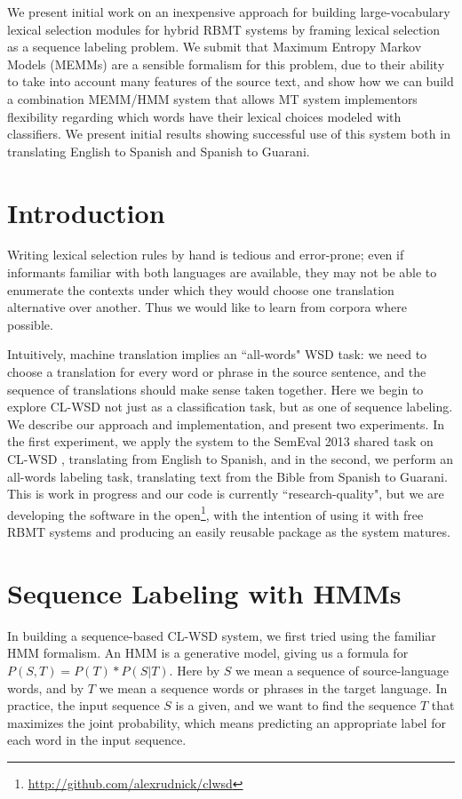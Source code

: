We present initial work on an inexpensive approach for building
large-vocabulary lexical selection modules for hybrid RBMT systems by framing
lexical selection as a sequence labeling problem. We submit that Maximum
Entropy Markov Models (MEMMs) are a sensible formalism for this problem, due to
their ability to take into account many features of the source text, and show
how we can build a combination MEMM/HMM system that allows MT system
implementors flexibility regarding which words have their lexical choices
modeled with classifiers. We present initial results showing successful use of
this system both in translating English to Spanish and Spanish to Guarani.

\lstset{
language=Python,
basicstyle=\small\sffamily,
numbers=none,
numberstyle=\tiny,
frame=tb,
columns=fullflexible,
showstringspaces=false
}


\section{Introduction}

Writing lexical selection rules by hand is tedious and error-prone; even if
informants familiar with both languages are available, they may not be able to
enumerate the contexts under which they would choose one translation
alternative over another. Thus we would like to learn from corpora where
possible. 





Intuitively, machine translation implies an ``all-words" WSD task: we need to
choose a translation for every word or phrase in the source sentence, and the
sequence of translations should make sense taken together. Here we begin to
explore CL-WSD not just as a classification task, but as one of sequence
labeling. We describe our approach and implementation, and present two
experiments. In the first experiment, we apply the system to the SemEval 2013
shared task on CL-WSD \cite{task10}, translating from English to Spanish, and
in the second, we perform an all-words labeling task, translating text from the
Bible from Spanish to Guarani. This is work in progress and our code is
currently ``research-quality", but we are developing the software in the
open\footnote{\url{http://github.com/alexrudnick/clwsd}}, with the intention of
using it with free RBMT systems and producing an easily reusable package as the
system matures.


\section{Sequence Labeling with HMMs}
In building a sequence-based CL-WSD system, we first tried using the familiar
HMM formalism. An HMM is a generative model, giving us a formula for $P(S, T) =
P(T) * P(S|T)$. Here by $S$ we mean a sequence of source-language words, and by
$T$ we mean a sequence words or phrases in the target language. In practice,
the input sequence $S$ is a given, and we want to find the sequence $T$ that
maximizes the joint probability, which means predicting an appropriate label
for each word in the input sequence.

